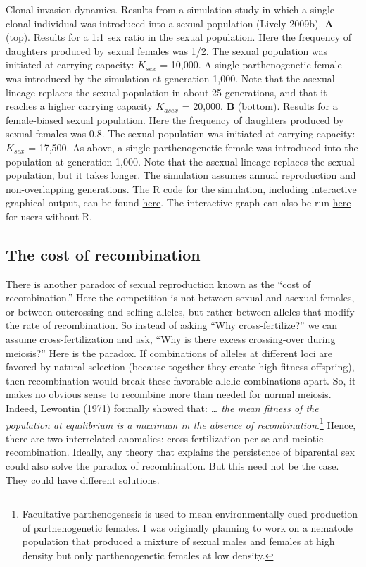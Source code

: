 \documentclass[
  letterpaper,
]{book}
\begin{document}
{\label{fig-1-2}Clonal invasion dynamics. Results from a simulation study
in which a single clonal individual was introduced into a sexual
population (Lively 2009b). \textbf{A} (top). Results for a 1:1 sex ratio
in the sexual population. Here the frequency of daughters produced by
sexual females was 1/2. The sexual population was initiated at carrying
capacity: \(K_{sex}\) = 10,000. A single parthenogenetic female was
introduced by the simulation at generation 1,000. Note that the asexual
lineage replaces the sexual population in about 25 generations, and that
it reaches a higher carrying capacity \(K_{asex}\) = 20,000. \textbf{B}
(bottom). Results for a female-biased sexual population. Here the
frequency of daughters produced by sexual females was 0.8. The sexual
population was initiated at carrying capacity: \(K_{sex}\) = 17,500. As
above, a single parthenogenetic female was introduced into the
population at generation 1,000. Note that the asexual lineage replaces
the sexual population, but it takes longer. The simulation assumes
annual reproduction and non-overlapping generations. The R code for the
simulation, including interactive graphical output, can be found
\href{https://raw.githubusercontent.com/IULibScholComm/through-the-looking-glass/main/sim\%20for\%20fig\%201.2(ZMD).R}{here}.
The interactive graph can also be run
\href{https://connect.posit.iu.edu/clonal-invasion-dynamics/}{here} for
users without R.

}

\hypertarget{the-cost-of-recombination}{%
\subsection{The cost of recombination}\label{the-cost-of-recombination}}

There is another paradox of sexual reproduction known as the ``cost of
recombination.'' Here the competition is not between sexual and asexual
females, or between outcrossing and selfing alleles, but rather between
alleles that modify the rate of recombination. So instead of asking
``Why cross-fertilize?'' we can assume cross-fertilization and ask,
``Why is there excess crossing-over during meiosis?'' Here is the
paradox. If combinations of alleles at different loci are favored by
natural selection (because together they create high-fitness offspring),
then recombination would break these favorable allelic combinations
apart. So, it makes no obvious sense to recombine more than needed for
normal meiosis. Indeed, Lewontin (1971) formally showed that:
\emph{\ldots{} the mean fitness of the population at equilibrium is a
maximum in the absence of recombination}.\footnote{Facultative
  parthenogenesis is used to mean environmentally cued production of
  parthenogenetic females. I was originally planning to work on a
  nematode population that produced a mixture of sexual males and
  females at high density but only parthenogenetic females at low
  density.} Hence, there are two interrelated anomalies:
cross-fertilization per se and meiotic recombination. Ideally, any
theory that explains the persistence of biparental sex could also solve
the paradox of recombination. But this need not be the case. They could
have different solutions.
\end{document}
